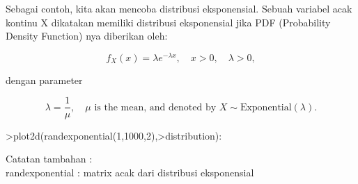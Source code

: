 \documentclass[12pt,arial,letterpaper]{book}
\begin{document}
\begin{eulercomment}
\begin{eulercomment}
\begin{eulercomment}
\begin{eulercomment}
\begin{eulercomment}
\begin{eulercomment}
\begin{eulercomment}
\begin{eulercomment}
\begin{eulercomment}
\begin{eulercomment}
\begin{eulercomment}
\begin{eulercomment}
\begin{eulercomment}
\begin{eulercomment}
\begin{eulercomment}
\begin{eulercomment}
\begin{eulercomment}
\begin{eulercomment}
\begin{eulercomment}
\begin{eulercomment}
\begin{eulercomment}
\begin{eulercomment}
\begin{eulercomment}
\begin{eulercomment}
\begin{eulercomment}
\begin{eulercomment}
\begin{eulercomment}
\begin{eulercomment}
\begin{eulercomment}
\begin{eulercomment}
\begin{eulercomment}
\begin{eulercomment}
\begin{eulercomment}
Sebagai contoh, kita akan mencoba distribusi eksponensial. Sebuah
variabel acak kontinu X dikatakan memiliki distribusi eksponensial
jika PDF (Probability Density Function) nya diberikan oleh:\\
\end{eulercomment}
\begin{eulerformula}
\[
f_X(x)=\lambda e^{-\lambda x},\quad x>0,\quad \lambda>0,
\]
\end{eulerformula}
\begin{eulercomment}
dengan parameter\\
\end{eulercomment}
\begin{eulerformula}
\[
\lambda=\frac{1}{\mu},\quad \mu \text{ is the mean, and denoted by } X \sim \text{Exponential}(\lambda).
\]
\end{eulerformula}
\begin{eulerprompt}
>plot2d(randexponential(1,1000,2),>distribution):
\end{eulerprompt}
\begin{eulercomment}
Catatan tambahan :\\
randexponential : matrix acak dari distribusi eksponensial


\end{eulercomment}
\end{eulercomment}
\end{eulercomment}
\end{eulercomment}
\end{eulercomment}
\end{eulercomment}
\end{eulercomment}
\end{eulercomment}
\end{eulercomment}
\end{eulercomment}
\end{eulercomment}
\end{eulercomment}
\end{eulercomment}
\end{eulercomment}
\end{eulercomment}
\end{eulercomment}
\end{eulercomment}
\end{eulercomment}
\end{eulercomment}
\end{eulercomment}
\end{eulercomment}
\end{eulercomment}
\end{eulercomment}
\end{eulercomment}
\end{eulercomment}
\end{eulercomment}
\end{eulercomment}
\end{eulercomment}
\end{eulercomment}
\end{eulercomment}
\end{eulercomment}
\end{eulercomment}
\end{eulercomment}
\end{document}
